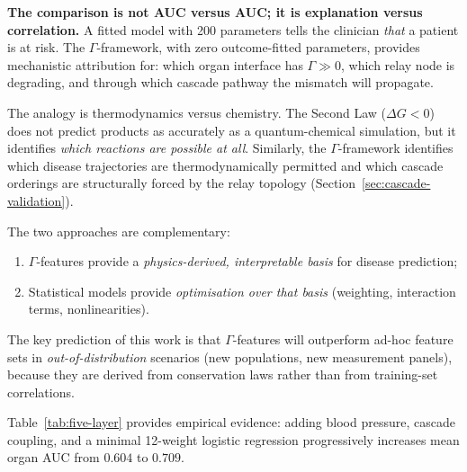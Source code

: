 \documentclass[aps,pre,twocolumn,superscriptaddress,floatfix]{revtex4-2}
\begin{document}
\textbf{The comparison is not AUC versus AUC;
it is explanation versus correlation.}
A fitted model with 200 parameters tells the clinician
\emph{that} a patient is at risk.
The $\Gamma$-framework, with zero outcome-fitted parameters,
provides mechanistic attribution for: which organ interface
has $\Gamma \gg 0$, which relay node is degrading,
and through which cascade pathway the mismatch
will propagate.

The analogy is thermodynamics versus chemistry.
The Second Law ($\Delta G < 0$) does not predict
products as accurately as a quantum-chemical
simulation, but it identifies \emph{which reactions
are possible at all}.
Similarly, the $\Gamma$-framework identifies which
disease trajectories are thermodynamically permitted
and which cascade orderings are structurally
forced by the relay topology
(Section~\ref{sec:cascade-validation}).

The two approaches are complementary:
\begin{enumerate}
  \item $\Gamma$-features provide a
    \emph{physics-derived, interpretable basis}
    for disease prediction;
  \item Statistical models provide
    \emph{optimisation over that basis}
    (weighting, interaction terms, nonlinearities).
\end{enumerate}
The key prediction of this work is that
$\Gamma$-features will outperform ad-hoc feature
sets in \emph{out-of-distribution} scenarios
(new populations, new measurement panels),
because they are derived from conservation laws
rather than from training-set correlations.

Table~\ref{tab:five-layer} provides empirical
evidence: adding blood pressure, cascade coupling,
and a minimal 12-weight logistic regression
progressively increases mean organ AUC
from $0.604$ to $0.709$.
\end{document}
